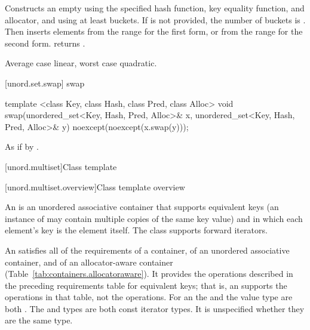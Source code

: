 \begin{itemdescr}
\pnum
\effects Constructs an empty  using the
specified hash function, key equality function, and allocator, and
using at least  buckets. If  is not
provided, the number of buckets is . Then
inserts elements from the range 
for the first form, or from the range 
 for the second form.
 returns .

\pnum
\complexity Average case linear, worst case quadratic.
\end{itemdescr}

[unord.set.swap]{ swap}

%
\begin{itemdecl}
template <class Key, class Hash, class Pred, class Alloc>
  void swap(unordered_set<Key, Hash, Pred, Alloc>& x,
            unordered_set<Key, Hash, Pred, Alloc>& y)
    noexcept(noexcept(x.swap(y)));
\end{itemdecl}

\begin{itemdescr}
\pnum\effects As if by .
\end{itemdescr}

[unord.multiset]{Class template }%

[unord.multiset.overview]{Class template  overview}

\pnum
{}%
%
An  is an unordered associative container
that supports equivalent keys (an instance of  may contain
multiple copies of the same key value) and in which each element's key
is the element itself.
The  class
supports forward iterators.

\pnum
An  satisfies all of the requirements of a container, of an
unordered associative container, and of an allocator-aware container
(Table~\ref{tab:containers.allocatoraware}). It provides the operations described in the
preceding requirements table for equivalent keys; that is, an 
supports the  operations in that table, not the  operations.
For an  the  and the value type are
both . The  and  types are both const
iterator types. It is unspecified whether they are the same type.

